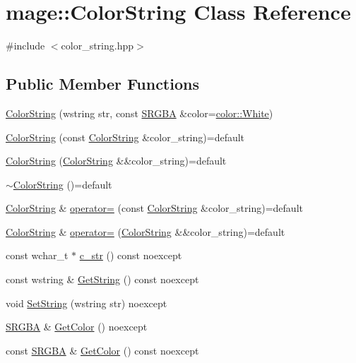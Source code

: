 \hypertarget{classmage_1_1_color_string}{}\section{mage\+:\+:Color\+String Class Reference}
\label{classmage_1_1_color_string}


{\ttfamily \#include $<$color\+\_\+string.\+hpp$>$}

\subsection*{Public Member Functions}
\begin{DoxyCompactItemize}
\item 
\hyperlink{classmage_1_1_color_string_a5387ce7ce0a8ed93f83daba3053a8acc}{Color\+String} (wstring str, const \hyperlink{structmage_1_1_s_r_g_b_a}{S\+R\+G\+BA} \&color=\hyperlink{namespacemage_1_1color_a727b7cc976b22af2949cec8bebdb3e74}{color\+::\+White})
\item 
\hyperlink{classmage_1_1_color_string_aa878fda012b4149f673e905f6a8ea8b0}{Color\+String} (const \hyperlink{classmage_1_1_color_string}{Color\+String} \&color\+\_\+string)=default
\item 
\hyperlink{classmage_1_1_color_string_a68d8411da4dd7122975223e25bbcbb9a}{Color\+String} (\hyperlink{classmage_1_1_color_string}{Color\+String} \&\&color\+\_\+string)=default
\item 
\hyperlink{classmage_1_1_color_string_a95886010269c8c4bc3a27fbfe829f4c2}{$\sim$\+Color\+String} ()=default
\item 
\hyperlink{classmage_1_1_color_string}{Color\+String} \& \hyperlink{classmage_1_1_color_string_a568fed43403422ecafdf92d04e11c4e5}{operator=} (const \hyperlink{classmage_1_1_color_string}{Color\+String} \&color\+\_\+string)=default
\item 
\hyperlink{classmage_1_1_color_string}{Color\+String} \& \hyperlink{classmage_1_1_color_string_a2016416ce91bb7e94a8869201db47ef1}{operator=} (\hyperlink{classmage_1_1_color_string}{Color\+String} \&\&color\+\_\+string)=default
\item 
const wchar\+\_\+t $\ast$ \hyperlink{classmage_1_1_color_string_af2241b81cac59051e9ebf0ddefe719ed}{c\+\_\+str} () const noexcept
\item 
const wstring \& \hyperlink{classmage_1_1_color_string_aee22268a2fe552320299dfa5ac5a93e1}{Get\+String} () const noexcept
\item 
void \hyperlink{classmage_1_1_color_string_ae735ab55789bb21741c6ad3c8115a146}{Set\+String} (wstring str) noexcept
\item 
\hyperlink{structmage_1_1_s_r_g_b_a}{S\+R\+G\+BA} \& \hyperlink{classmage_1_1_color_string_a524e8a66e94a353724c45728e3b73dc1}{Get\+Color} () noexcept
\item 
const \hyperlink{structmage_1_1_s_r_g_b_a}{S\+R\+G\+BA} \& \hyperlink{classmage_1_1_color_string_a51e959bf9ba68b767fe2b61655a9c7a9}{Get\+Color} () const noexcept
\end{DoxyCompactItemize}
